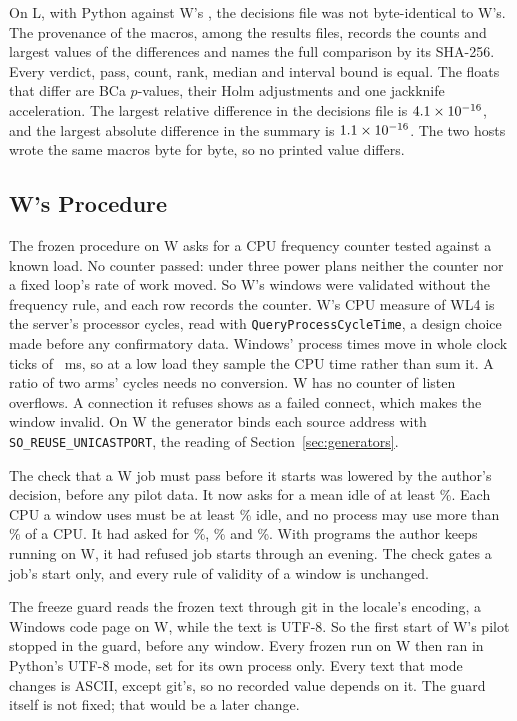 On L, with Python \RerunPythonL{} against W's \AnalysisPythonW, the decisions file was not
byte-identical to W's. The provenance of the macros, among the results files, records the counts
and largest values of the differences and names the full comparison by its SHA-256. Every verdict, pass, count, rank, median and interval bound is equal. The floats that
differ are BCa $p$-values, their Holm adjustments and one jackknife acceleration. The largest
relative difference in the decisions file is $4.1\times10^{-16}$, and the largest absolute
difference in the summary is $1.1\times10^{-16}$. The two hosts wrote the same macros byte for
byte, so no printed value differs.

\subsection{W's Procedure}\label{sec:dev-w}

The frozen procedure on W asks for a CPU frequency counter tested against a known load. No counter
passed: under three power plans neither the counter nor a fixed loop's rate of work moved. So W's
windows were validated without the frequency rule, and each row records the counter. W's CPU
measure of WL4 is the server's processor cycles, read with \texttt{QueryProcessCycleTime}, a design
choice made before any confirmatory data. Windows' process times move in whole clock ticks of
\WTickMs~ms, so at a low load they sample the CPU time rather than sum it. A ratio of two arms'
cycles needs no conversion. W has no counter of listen overflows. A connection it refuses shows as a
failed connect, which makes the window invalid. On W the generator binds each source address with
\texttt{SO\_REUSE\_UNICASTPORT}, the reading of Section~\ref{sec:generators}.

The check that a W job must pass before it starts was lowered by the author's decision, before any
pilot data. It now asks for a mean idle of at least \QuietIdleMin\%. Each CPU a window uses must be
at least \QuietCpuIdleMin\% idle, and no process may use more than \QuietProcessMax\% of a CPU. It
had asked for \QuietIdleOld\%, \QuietCpuIdleOld\% and \QuietProcessOld\%. With programs the author
keeps running on W, it had refused job starts through an evening. The check gates a job's start
only, and every rule of validity of a window is unchanged.

The freeze guard reads the frozen text through git in the locale's encoding, a Windows code page on
W, while the text is UTF-8. So the first start of W's pilot stopped in the guard, before any window.
Every frozen run on W then ran in Python's UTF-8 mode, set for its own process only. Every text that
mode changes is ASCII, except git's, so no recorded value depends on it. The guard itself is not
fixed; that would be a later change.

